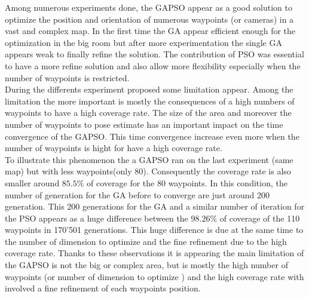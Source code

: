 Among numerous experiments done, the GAPSO appear as a good solution to optimize the position and orientation of numerous waypoints (or cameras) in a vast and complex map.
In the first time the GA appear efficient enough for the optimization in the big room but after more experimentation the single GA appears weak to finally refine the solution. The contribution of PSO was essential to have a more refine solution and also allow more flexibility especially when the number of waypoints is restricted. \\
During the differents experiment proposed some limitation appear. Among the limitation the more important is mostly the consequences of a high numbers of waypoints to have a high coverage rate.
 The size of the area and moreover the number of waypoints to pose estimate has an important impact on the time convergence of the GAPSO.  This time convergence increase even more when the number of waypoints is hight  for have a high coverage rate. \\
 To illustrate this phenomenon the a GAPSO ran on the last experiment (same map) but  with less waypoints(only 80). Consequently the coverage rate is also smaller around $85.5\%$ of coverage for  the 80 waypoints. In this condition, the number of generation for the GA before to converge are just around 200 generation.  This 200 generations for the GA and a similar number of iteration for the PSO appears as a huge difference between the $98.26\%$ of coverage of the 110 waypoints in 170'501 generations. This huge difference is due at the same time to the number of dimension to optimize and the fine refinement due to the high coverage rate.
 Thanks to these observations it is appearing the main limitation of the GAPSO is not the  big or complex area, but is mostly the high number of waypoints (or number of dimension to optimize ) and the high coverage rate with involved a fine refinement of each waypoints position. 
 





